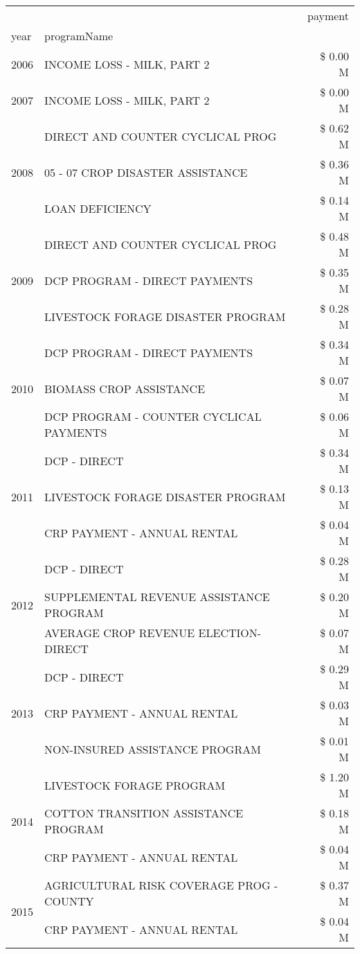 \begin{tabular}{llr}
\toprule
 &  & payment \\
year & programName &  \\
\midrule
2006 & INCOME LOSS - MILK, PART 2 & \$ 0.00 M \\
\cline{1-3}
2007 & INCOME LOSS - MILK, PART 2 & \$ 0.00 M \\
\cline{1-3}
\multirow[t]{3}{*}{2008} & DIRECT AND COUNTER CYCLICAL PROG & \$ 0.62 M \\
 & 05 - 07 CROP DISASTER ASSISTANCE & \$ 0.36 M \\
 & LOAN DEFICIENCY & \$ 0.14 M \\
\cline{1-3}
\multirow[t]{3}{*}{2009} & DIRECT AND COUNTER CYCLICAL PROG & \$ 0.48 M \\
 & DCP PROGRAM - DIRECT PAYMENTS & \$ 0.35 M \\
 & LIVESTOCK FORAGE DISASTER  PROGRAM & \$ 0.28 M \\
\cline{1-3}
\multirow[t]{3}{*}{2010} & DCP PROGRAM - DIRECT PAYMENTS & \$ 0.34 M \\
 & BIOMASS CROP ASSISTANCE & \$ 0.07 M \\
 & DCP PROGRAM - COUNTER CYCLICAL PAYMENTS & \$ 0.06 M \\
\cline{1-3}
\multirow[t]{3}{*}{2011} & DCP - DIRECT & \$ 0.34 M \\
 & LIVESTOCK FORAGE DISASTER PROGRAM & \$ 0.13 M \\
 & CRP PAYMENT - ANNUAL RENTAL & \$ 0.04 M \\
\cline{1-3}
\multirow[t]{3}{*}{2012} & DCP - DIRECT & \$ 0.28 M \\
 & SUPPLEMENTAL REVENUE ASSISTANCE PROGRAM & \$ 0.20 M \\
 & AVERAGE CROP REVENUE ELECTION-DIRECT & \$ 0.07 M \\
\cline{1-3}
\multirow[t]{3}{*}{2013} & DCP - DIRECT & \$ 0.29 M \\
 & CRP PAYMENT - ANNUAL RENTAL & \$ 0.03 M \\
 & NON-INSURED ASSISTANCE PROGRAM & \$ 0.01 M \\
\cline{1-3}
\multirow[t]{3}{*}{2014} & LIVESTOCK FORAGE PROGRAM & \$ 1.20 M \\
 & COTTON TRANSITION ASSISTANCE PROGRAM & \$ 0.18 M \\
 & CRP PAYMENT - ANNUAL RENTAL & \$ 0.04 M \\
\cline{1-3}
\multirow[t]{3}{*}{2015} & AGRICULTURAL RISK COVERAGE PROG - COUNTY & \$ 0.37 M \\
 & CRP PAYMENT - ANNUAL RENTAL & \$ 0.04 M \\

\end{tabular}
